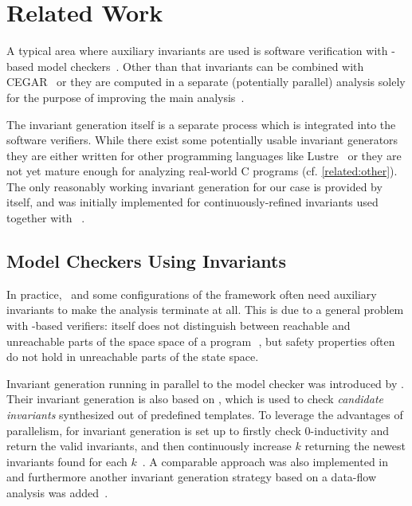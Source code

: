 \chapter{Related Work}
A typical area where auxiliary invariants are used is software verification with \Kinduction{}-based
model checkers~\cite{Beyer:KInduction, Awedh:KInduction-Inv, Kahsai:Kinduction-Inv}.
Other than that invariants can be combined with \ac{CEGAR}~\cite{Beyer:PathInvariants} or they
are computed in a separate (potentially parallel) analysis solely for the purpose of
improving the main analysis~\cite{Gurfinkel:Seahorn}.

The invariant generation itself is a separate process which is integrated into the
software verifiers. While there exist some potentially usable invariant
generators~\cite{Gupta:InvGen, Ernst:Daikon, Awedh:KInduction-Inv} they are either written
for other programming languages like Lustre~\cite{Lustre} or they are not yet mature enough
for analyzing real-world C programs (cf. \autoref{related:other}). The only
reasonably working invariant generation for our case is provided by \CPAchecker{} itself,
and was initially implemented for continuously-refined invariants
used together with \mbox{\Kinduction{}}~\cite{Beyer:KInduction}.


\section{Model Checkers Using Invariants}

In practice, \PKIND{}\, and some configurations of the \CPAchecker{} framework
often need auxiliary invariants to
make the analysis terminate at all. This is due to a general problem with \Kinduction{}-based
verifiers: \Kinduction{}  itself does not distinguish between reachable and unreachable parts
of the space space of a program~\cite{Beyer:KInduction}\,, but safety properties often do not hold in unreachable
parts of the state space.

Invariant generation running in parallel to the model checker was introduced by \PKIND{}.
Their invariant generation is also based on \Kinduction{}, which is used to check
\emph{candidate invariants} synthesized out of predefined templates. To leverage the
advantages of parallelism, \Kinduction{} for invariant generation is set up to firstly check
0-inductivity and return the valid invariants, and then continuously increase $k$ returning
the newest invariants found for each $k$~\cite{Kahsai:Kinduction-Inv}. A comparable
approach was also implemented in \CPAchecker{} and furthermore another invariant generation
strategy based on a data-flow analysis was added~\cite{Beyer:KInduction}.

